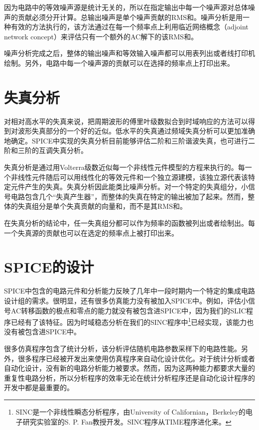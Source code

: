 因为电路中的等效噪声源是统计无关的，所以在指定输出中每一个噪声源对总体噪声的贡献必须分开计算。总输出噪声是单个噪声贡献的RMS和。噪声分析是用一种有效的方法执行的，该方法通过在每一个频率点上利用临近网络概念（adjoint network concept）\cite{ref-8,ref-10}来评估只有一个额外的AC解下的该RMS和。

噪声分析完成之后，整体的输出噪声和等效输入噪声都可以用表列出或者线打印机绘制。另外，电路中每一个噪声源的贡献可以在选择的频率点上打印出来。

\section{失真分析}
对相对高水平的失真来说，把周期波形的傅里叶级数拟合到时域响应的方法可以得到对波形失真部分的一个好的近似。低水平的失真通过频域失真分析\cite{ref-11,ref-12}可以更加准确地确定。SPICE中实现的失真分析目前能够评估二阶和三阶谐波失真，也可进行二阶和三阶的互调失真分析。

失真分析是通过用Volterra级数\cite{ref-13}近似每一个非线性元件模型的方程来执行的。每一个非线性元件随后可以用线性化的等效元件和一个独立源建模，该独立源代表该特定元件产生的失真。失真分析因此能类比噪声分析。对一个特定的失真组分，小信号电路包含几个“失真产生器”，而整体的失真在特定的输出被加了起来。然而，整体的失真组分是单个失真贡献的向量和，而不是其RMS和。

在失真分析的结论中，任一失真组分都可以作为频率的函数被列出或者绘制出。每一个失真源的贡献也可以在选定的频率点上被打印出来。

\section{SPICE的设计}
SPICE中包含的电路元件和分析能力反映了几年中一段时期内一个特定的集成电路设计组的需求。很明显，还有很多仿真能力没有被加入SPICE中。例如，评估小信号AC转移函数的极点和零点的能力就没有被包含进SPICE中，因为我们的SLIC程序\cite{ref-14,ref-15}已经有了该特征。因为时域稳态分析\cite{ref-16,ref-17,ref-18}在我们的SINC程序中\footnote{SINC是一个非线性瞬态分析程序，由University of Californian，Berkeley的电子研究实验室的S. P. Fan教授开发。SINC程序从TIME程序进化来\cite{ref-19}。}已经实现，该能力也没有被包含进SPICE中。

很多仿真程序包含了统计分析\cite{ref-20,ref-21,ref-22}，该分析评估随机电路参数采样下的电路性能。另外，很多程序已经被开发出来使用仿真程序来自动化设计优化\cite{ref-23,ref-24,ref-25,ref-26,ref-27}。对于统计分析或者自动化设计，没有新的电路分析能力被要求。然而，因为这两种能力都要求大量的重复性电路分析，所以分析程序的效率无论在统计分析程序还是自动化设计程序的开发中都是最重要的。

